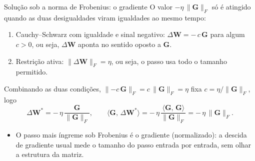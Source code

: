 \documentclass[aspectratio=169,xcolor=dvipsnames]{beamer}
\begin{document}
  \begin{frame}{Solução sob a norma de Frobenius: o gradiente}
    O valor $-\eta\,\|\mathbf{G}\|_{F}$ só é atingido quando as \alert{duas} desigualdades viram igualdades ao mesmo tempo:
    \begin{enumerate}
      \item Cauchy--Schwarz com igualdade e sinal negativo: $\Delta \mathbf{W}=-\,c\,\mathbf{G}$ para algum
        $c>0$, ou seja, $\Delta \mathbf{W}$ aponta no sentido oposto a $\mathbf{G}$.
      \item Restrição ativa: $\|\Delta \mathbf{W}\|_{F}=\eta$, ou seja, o passo usa todo o tamanho permitido.
    \end{enumerate}
    Combinando as duas condições, $\|{-c}\,\mathbf{G}\|_{F}=c\,\|\mathbf{G}\|_{F}=\eta$ fixa $c=\eta/\|\mathbf{G}\|_{F}$, logo
    \[
      \Delta \mathbf{W}^{*}=-\,\eta\,\frac{\mathbf{G}}{\|\mathbf{G}\|_{F}},
      \qquad
      \langle \mathbf{G},\,\Delta \mathbf{W}^{*}\rangle=-\,\eta\,\frac{\langle \mathbf{G},\,\mathbf{G}\rangle}{\|\mathbf{G}\|_{F}}=-\,\eta\,\|\mathbf{G}\|_{F}.
    \]
    \begin{itemize}
      \item O passo mais íngreme sob Frobenius é o \alert{gradiente} (normalizado): a descida
        de gradiente usual mede o tamanho do passo entrada por entrada, sem olhar a
        estrutura da matriz.
    \end{itemize}
  \end{frame}
\end{document}
